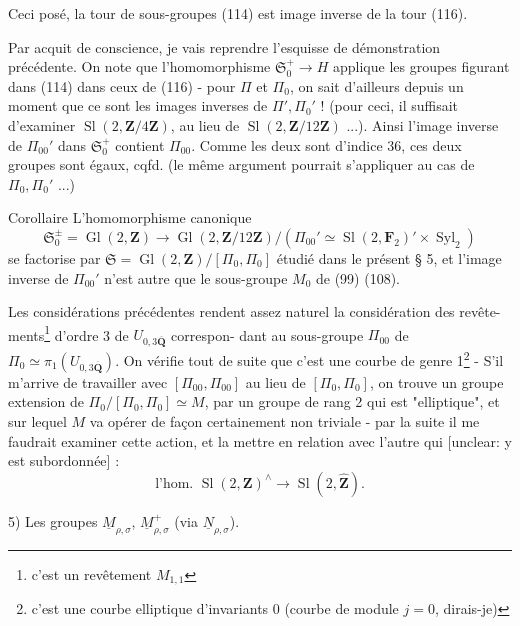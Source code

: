 
Ceci posé, la tour de sous-groupes (114) est image inverse de la tour (116).

Par acquit de conscience, je vais reprendre l'esquisse de démonstration précédente. On note que l'homomorphisme $\mathfrak{S}_0^+ \to H$ applique les groupes figurant dans (114) dans ceux de (116) - pour $\Pi$ et $\Pi_0$, on sait d'ailleurs depuis un moment que ce sont les images inverses de $\Pi', \Pi_0'$ ! (pour ceci, il suffisait d'examiner $\operatorname{Sl}(2, \mathbf{Z}/4\mathbf{Z})$, au lieu de $\operatorname{Sl}(2, \mathbf{Z}/12\mathbf{Z})$ ...). Ainsi l'image inverse de $\Pi_{00}'$ dans $\mathfrak{S}_0^+$ contient $\Pi_{00}$. Comme les deux sont d'indice $36$, ces deux groupes sont égaux, cqfd. (le même argument pourrait s'appliquer au cas de $\Pi_0, \Pi_0'$ ...)

Corollaire L'homomorphisme canonique
$$
\mathfrak{S}_0^\pm = \operatorname{Gl}(2,\mathbf{Z}) \to \operatorname{Gl}(2,\mathbf{Z}/12\mathbf{Z}) / (\Pi_{00}' \simeq \operatorname{Sl}(2,\mathbf{F}_2)' \times \operatorname{Syl}_2)
$$
se factorise par $\mathfrak{S} = \operatorname{Gl}(2,\mathbf{Z})/[\Pi_0,\Pi_0]$ étudié dans le présent § 5, et l'image inverse de $\Pi_{00}'$ n'est autre que le sous-groupe $M_0$ de (99) (108).

\newpage


Les considérations précédentes rendent
assez naturel la considération des revête-
ments\footnote{c'est un revêtement $M_{1,1}$} d'ordre 3 de $U_{0,3 \overline{\mathbf{Q}}}$ correspon-
dant au sous-groupe $\Pi_{00}$ de $\Pi_0 \simeq \pi_1(U_{0,3 \overline{\mathbf{Q}}})$.
On vérifie tout de suite que c'est
une courbe de genre 1\footnote{c'est une courbe elliptique d'invariants $0$ (courbe de module $j=0$, dirais-je)} - S'il
m'arrive de travailler avec
$[\Pi_{00}, \Pi_{00}]$ au lieu de $[\Pi_0, \Pi_0]$, on
trouve un groupe extension de
$\Pi_0 / [\Pi_0, \Pi_0] \simeq M$, par un groupe de rang 2
qui est "elliptique", et sur
lequel $M$ va opérer de façon
certainement non triviale - par la suite
il me faudrait examiner cette action,
et la mettre en relation avec l'autre
qui [unclear: y est subordonnée] :
$$
\text{l'hom. } \operatorname{Sl}(2, \mathbf{Z})^{\wedge} \longrightarrow \operatorname{Sl}(2, \hat{\mathbf{Z}}).
$$

\newpage


5) Les groupes $\underline{M}_{\rho,\sigma}$, $\underline{M}_{\rho,\sigma}^+$ (via $\underline{N}_{\rho,\sigma}$).

